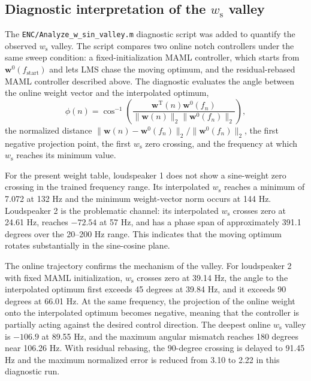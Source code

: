 \documentclass{internoise2026}
\begin{document}
\subsection{Diagnostic interpretation of the \texorpdfstring{$w_{\mathrm{s}}$}{w-sin} valley}

The \texttt{ENC/Analyze\_w\_sin\_valley.m} diagnostic script was added to quantify the observed $w_{\mathrm{s}}$ valley. The script compares two online notch controllers under the same sweep condition: a fixed-initialization MAML controller, which starts from $\mathbf{w}^{0}(f_{\mathrm{start}})$ and lets LMS chase the moving optimum, and the residual-rebased MAML controller described above. The diagnostic evaluates the angle between the online weight vector and the interpolated optimum,
\begin{equation}
  \phi(n)=
  \cos^{-1}
  \left(
  \frac{\mathbf{w}^{\mathrm{T}}(n)\mathbf{w}^{0}(f_n)}
  {\|\mathbf{w}(n)\|_2\|\mathbf{w}^{0}(f_n)\|_2}
  \right),
  \label{eq:angle_metric}
\end{equation}
the normalized distance $\|\mathbf{w}(n)-\mathbf{w}^{0}(f_n)\|_2/\|\mathbf{w}^{0}(f_n)\|_2$, the first negative projection point, the first $w_{\mathrm{s}}$ zero crossing, and the frequency at which $w_{\mathrm{s}}$ reaches its minimum value.

For the present weight table, loudspeaker 1 does not show a sine-weight zero crossing in the trained frequency range. Its interpolated $w_{\mathrm{s}}$ reaches a minimum of 7.072 at 132 Hz and the minimum weight-vector norm occurs at 144 Hz. Loudspeaker 2 is the problematic channel: its interpolated $w_{\mathrm{s}}$ crosses zero at 24.61 Hz, reaches $-72.54$ at 57 Hz, and has a phase span of approximately 391.1 degrees over the 20--200 Hz range. This indicates that the moving optimum rotates substantially in the sine-cosine plane.

The online trajectory confirms the mechanism of the valley. For loudspeaker 2 with fixed MAML initialization, $w_{\mathrm{s}}$ crosses zero at 39.14 Hz, the angle to the interpolated optimum first exceeds 45 degrees at 39.84 Hz, and it exceeds 90 degrees at 66.01 Hz. At the same frequency, the projection of the online weight onto the interpolated optimum becomes negative, meaning that the controller is partially acting against the desired control direction. The deepest online $w_{\mathrm{s}}$ valley is $-106.9$ at 89.55 Hz, and the maximum angular mismatch reaches 180 degrees near 106.26 Hz. With residual rebasing, the 90-degree crossing is delayed to 91.45 Hz and the maximum normalized error is reduced from 3.10 to 2.22 in this diagnostic run.
\end{document}
